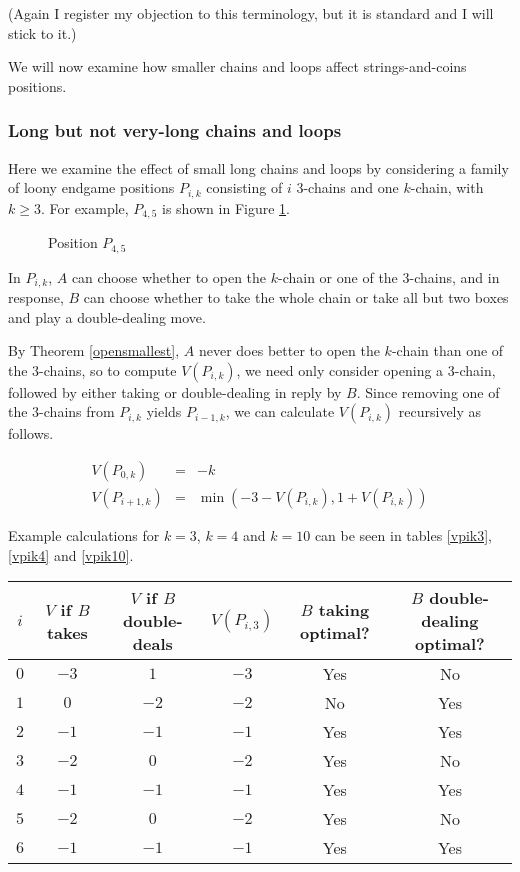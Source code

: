 \documentclass[a4paper,twocolumn]{article}
\begin{document}
(Again I register my objection to this terminology, but it is standard
and I will stick to it.)

We will now examine how smaller chains and loops affect
strings-and-coins positions.

\subsubsection{Long but not very-long chains and loops}

Here we examine the effect of small long chains and loops by
considering a family of loony endgame positions $P_{i,k}$ consisting
of $i$ 3-chains and one $k$-chain, with $k \ge 3$. For example,
$P_{4,5}$ is shown in Figure \ref{p45}.

\begin{figure}
  \centering
  \def\svgscale{0.7}
  
  \caption{Position $P_{4,5}$}
  \label{p45}
\end{figure}

In $P_{i,k}$, $A$ can choose whether to open the $k$-chain or one of
the 3-chains, and in response, $B$ can choose whether to take the
whole chain or take all but two boxes and play a double-dealing move.

By Theorem \ref{opensmallest}, $A$ never does better to open the
$k$-chain than one of the 3-chains, so to compute $V(P_{i,k})$, we
need only consider opening a 3-chain, followed by either taking or
double-dealing in reply by $B$. Since removing one of the 3-chains
from $P_{i,k}$ yields $P_{i-1,k}$, we can calculate $V(P_{i,k})$
recursively as follows.

\begin{eqnarray*}
  V(P_{0,k}) & = & -k \\
  V(P_{i+1,k}) & = & \min(-3-V(P_{i,k}), 1+V(P_{i,k}))
\end{eqnarray*}

Example calculations for $k=3$, $k=4$ and $k=10$ can be seen in tables
\ref{vpik3}, \ref{vpik4} and \ref{vpik10}.

\begin{table*}[p]
  \centering
  \begin{tabular}{c c c c c c}
    $i$ & $V$ if $B$ takes & $V$ if $B$ double-deals & $V(P_{i,3})$ & $B$ taking optimal? & $B$ double-dealing optimal? \\
    \hline
    $0$ & $-3$ & $1$ & $-3$ & Yes & No \\
    $1$ & $0$ & $-2$ & $-2$ & No & Yes \\
    $2$ & $-1$ & $-1$ & $-1$ & Yes & Yes \\
    $3$ & $-2$ & $0$ & $-2$ & Yes & No \\
    $4$ & $-1$ & $-1$ & $-1$ & Yes & Yes \\
    $5$ & $-2$ & $0$ & $-2$ & Yes & No \\
    $6$ & $-1$ & $-1$ & $-1$ & Yes & Yes
  \end{tabular}
  \caption{$k=3$}
  \label{vpik3}
\end{table*}
\end{document}
